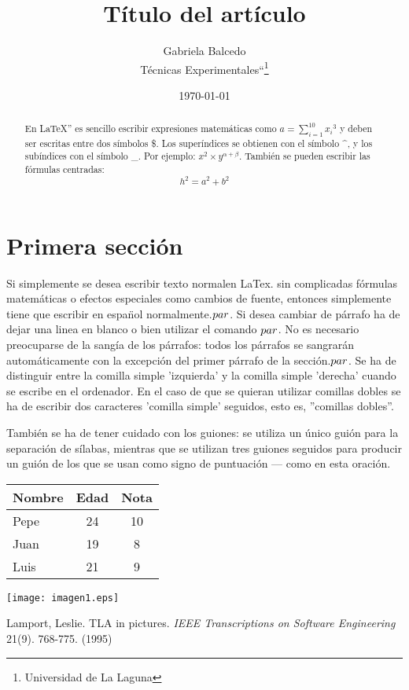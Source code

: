 \documentclass[a4paper,12pt]{article}
\begin{document}
\title{Título del artículo}
\author{Gabriela Balcedo\\
    Técnicas Experimentales``\footnote{Universidad de La Laguna}
    }
\date{\today}
\maketitle
\begin{abstract}
 En \LaTeX{}''\cite{Lam:86} es sencillo escribir expresiones
 matemáticas como $a=\sum_{i=1}^{10} {x_i}^{3}$
 y deben ser escritas entre dos símbolos \$.
 Los superíndices se obtienen con el símbolo \^{}, y
 los subíndices con el símbolo \_.
 Por ejemplo: $x^2\times y^{\alpha + \beta}$.
 También se pueden escribir las fórmulas centradas:
 \[h^2=a^2 + b^2\]
\end{abstract}

\section{Primera sección}
Si simplemente se desea escribir texto normalen LaTex.
sin complicadas f\'ormulas matem\'aticas o efectos especiales
como cambios de fuente, entonces simplemente tiene que escribir
en espa\"nol normalmente.$\\par$.
Si desea cambiar de párrafo ha de dejar una linea en blanco o bien
utilizar el comando $\\par$.
No es necesario preocuparse de la sangía de los párrafos:
todos los párrafos se sangrarán automáticamente con la excepción 
del primer párrafo de la sección.$\\par$.
Se ha de distinguir entre la comilla simple 'izquierda'
y la comilla simple 'derecha' cuando se escribe en el ordenador.
En el caso de que se quieran utilizar comillas dobles se ha de
escribir dos caracteres 'comilla simple' seguidos, esto es,
''comillas dobles''.

También se ha de tener cuidado con los guiones: se utiliza un único
guión para la separación de sílabas, mientras que se utilizan
tres guiones seguidos para producir un guión de los que se usan
como signo de puntuación --- como en esta oración.


\bigskip
\begin{tabular}{|l|c|c|}
 \hline
  Nombre & Edad & Nota\\ \hline
  Pepe & 24 & 10 \\ \hline
  Juan & 19 & 8 \\ \hline
  Luis & 21 & 9 \\ \hline
\end{tabular}

\texttt{[image: imagen1.eps]}

\begin{thebibliography}{00}
    Lamport, Leslie.
    TLA in pictures.
    \emph{IEEE Transcriptions on Software Engineering}
    21(9). 768-775.
    (1995)
    
\end{thebibliography}
\end{document}
